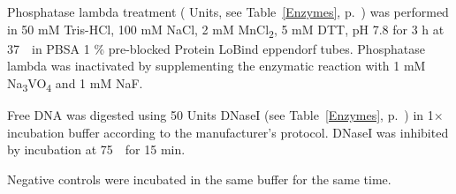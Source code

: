 Phosphatase lambda treatment ( Units, see Table~\ref{Enzymes}, p.~\pageref{Enzymes}) was performed in 50 mM Tris-HCl, 100 mM NaCl, 2 mM MnCl\textsubscript{2}, 5 mM DTT, pH 7.8 for 3 h at 37~\textcelsius~in PBSA 1 \% pre-blocked Protein LoBind eppendorf tubes. Phosphatase lambda was inactivated by supplementing the enzymatic reaction with 1 mM Na\textsubscript{3}VO\textsubscript{4} and 1 mM NaF. 

Free DNA was digested using 50 Units DNaseI (see Table~\ref{Enzymes}, p.~\pageref{Enzymes}) in 1$\times$ incubation buffer according to the manufacturer’s protocol. DNaseI was inhibited by incubation at 75~\textcelsius~for 15 min. 

Negative controls were incubated in the same buffer for the same time.






